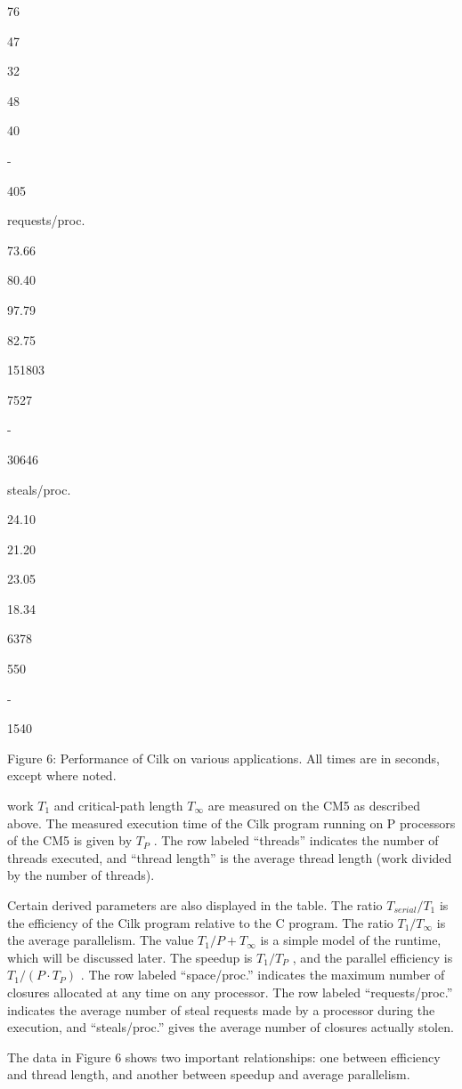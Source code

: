 \documentclass[
]{article}
\begin{document}
76

47

32

48

40

-

405

requests/proc.

73.66

80.40

97.79

82.75

151803

7527

-

30646

steals/proc.

24.10

21.20

23.05

18.34

6378

550

-

1540

Figure 6: Performance of Cilk on various applications. All times are in
seconds, except where noted.

work \(T_{1}\) and critical-path length \(T_{\infty}\) are measured on
the CM5 as described above. The measured execution time of the Cilk
program running on P processors of the CM5 is given by \(T_{P}\) . The
row labeled ``threads'' indicates the number of threads executed, and
``thread length'' is the average thread length (work divided by the
number of threads).

Certain derived parameters are also displayed in the table. The ratio
\(T_{serial}/T_{1}\) is the efficiency of the Cilk program relative to
the C program. The ratio \(T_{1}/T_{\infty}\) is the average
parallelism. The value \(T_{1}/P + T_{\infty}\) is a simple model of the
runtime, which will be discussed later. The speedup is \(T_{1}/T_{P}\) ,
and the parallel efficiency is \(T_{1}/(P \cdot T_{P})\) . The row
labeled ``space/proc.'' indicates the maximum number of closures
allocated at any time on any processor. The row labeled
``requests/proc.'' indicates the average number of steal requests made
by a processor during the execution, and ``steals/proc.'' gives the
average number of closures actually stolen.

The data in Figure 6 shows two important relationships: one between
efficiency and thread length, and another between speedup and average
parallelism.
\end{document}

